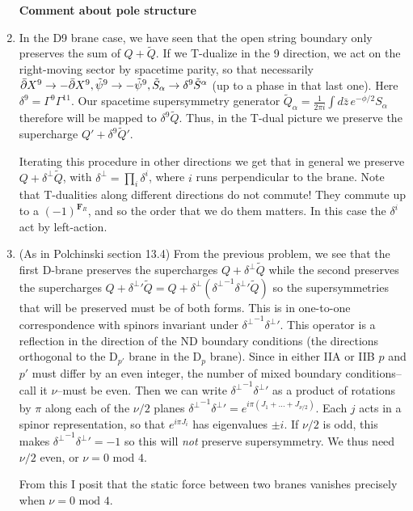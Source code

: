 \documentclass[11pt, class=article, crop=false]{standalone}
\begin{document}
\begin{enumerate}
	\textbf{Comment about pole structure}
	
	\item In the D9 brane case, we have seen that the open string boundary only preserves the sum of $Q + \tilde Q$. If we T-dualize in the 9 direction, we act on the right-moving sector by spacetime parity, so that necessarily $\bar {\partial} X^9 \to - \bar {\partial} X^9, \tilde \psi^9 \to - \tilde \psi^9, \tilde S_\alpha \to \delta^9 \tilde S^\alpha$ (up to a phase in that last one). Here $\delta^9 = \Gamma^9 \Gamma^{11}$. Our spacetime supersymmetry generator $\tilde Q_\alpha = \frac{1}{2\pi i} \int d\bar z\, e^{-\phi/2} S_{\alpha}$ therefore will be mapped to $\delta^9 \tilde Q$. Thus, in the T-dual picture we preserve the supercharge $Q' + \delta^9 \tilde Q'$.
	
	Iterating this procedure in other directions we get that in general we preserve $Q + \delta^\perp \tilde Q$, with $\delta^\perp = \prod_{i} \delta^i$, where $i$ runs perpendicular to the brane. Note that T-dualities along different directions do not commute! They commute up to a $(-1)^{\mathbf{F}_R}$, and so the order that we do them matters. In this case the $\delta^i$ act by left-action.
	
	\item (As in Polchinski section 13.4) From the previous problem, we see that the first D-brane preserves the supercharges $Q + \delta^\perp \tilde Q$ while the second preserves the supercharges $Q + {\delta^\perp}' \tilde Q = Q + \delta^\perp ({\delta^\perp}^{-1} {\delta^\perp}' \tilde Q)$ so the supersymmetries that will be preserved must be of both forms. This is in one-to-one correspondence with spinors invariant under ${\delta^\perp}^{-1} {\delta^\perp}'$. This operator is a reflection in the direction of the ND boundary conditions (the directions orthogonal to the D$_{p'}$ brane in the D$_p$ brane). Since in either IIA or IIB $p$ and $p'$ must differ by an even integer, the number of mixed boundary conditions--call it $\nu$--must be even. Then we can write ${\delta^\perp}^{-1} {\delta^\perp}'$ as a product of rotations by $\pi$ along each of the $\nu/2$ planes ${\delta^\perp}^{-1} {\delta^\perp}' = e^{i \pi (J_1 + \dots + J_{\nu/2})}$. Each $j$ acts in a spinor representation, so that $e^{i \pi J_i}$ has eigenvalues $\pm i$. If $\nu/2$ is odd, this makes ${\delta^\perp}^{-1} {\delta^\perp}' = -1$ so this will \emph{not} preserve supersymmetry. We thus need $\nu/2$ even, or $\nu = 0$ mod $4$.
	
	
	From this I posit that the static force between two branes vanishes precisely when $\nu = 0 \text{ mod } 4$.
	

\end{enumerate}
\end{document}
